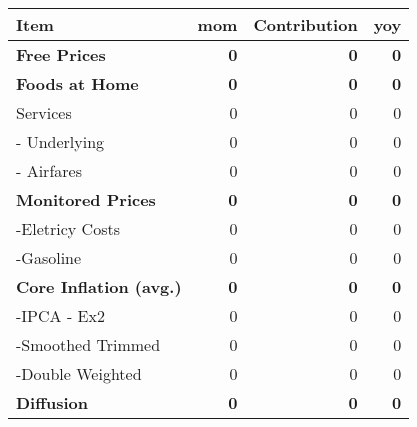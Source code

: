 \documentclass[11pt]{article}
\author{user}
\date{\today}
\title{}
\begin{document}
\begin{center}
\begin{tabular}{lrrr}
\textbf{Item} & \textbf{mom} & \textbf{Contribution} & \textbf{yoy}\\
\hline
\textbf{Free Prices} & \textbf{0} & \textbf{0} & \textbf{0}\\
\textbf{Foods at Home} & \textbf{0} & \textbf{0} & \textbf{0}\\
Services & 0 & 0 & 0\\
- Underlying & 0 & 0 & 0\\
- Airfares & 0 & 0 & 0\\
\textbf{Monitored Prices} & \textbf{0} & \textbf{0} & \textbf{0}\\
-Eletricy Costs & 0 & 0 & 0\\
-Gasoline & 0 & 0 & 0\\
\textbf{Core Inflation (avg.)} & \textbf{0} & \textbf{0} & \textbf{0}\\
-IPCA - Ex2 & 0 & 0 & 0\\
-Smoothed Trimmed & 0 & 0 & 0\\
-Double Weighted & 0 & 0 & 0\\
\textbf{Diffusion} & \textbf{0} & \textbf{0} & \textbf{0}\\
\end{tabular}
\end{center}
\end{document}

